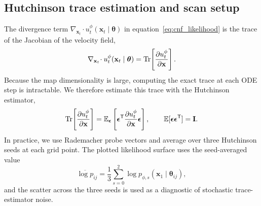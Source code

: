 \documentclass[usenatbib]{mnras}
\newcommand{\thetavec}{\boldsymbol{\theta}}
\begin{document}
\subsection{Hutchinson trace estimation and scan setup}
\label{sec:likelihood_hutchinson}
The divergence term
$\nabla_{\mathbf{x}_t}\!\cdot
u_t^\phi(\mathbf{x}_t\mid\thetavec)$ in
equation~\eqref{eq:cnf_likelihood}
is the trace of the Jacobian of the velocity field,
\begin{equation}
  \nabla_{\mathbf{x}_t}\!\cdot
  u_t^\phi(\mathbf{x}_t\mid\thetavec)
  =
  {\rm Tr}\!\left[
    \frac{\partial u_t^\phi}{\partial \mathbf{x}}
  \right].
  \label{eq:trace_exact}
\end{equation}
Because the map dimensionality is large, computing the exact trace at
each ODE step is intractable. We therefore estimate this trace with
the Hutchinson estimator,
\begin{equation}
  {\rm Tr}\!\left[
    \frac{\partial u_t^\phi}{\partial \mathbf{x}}
  \right]
  =
  \mathbb{E}_{\boldsymbol{\epsilon}}
  \left[
    \boldsymbol{\epsilon}^{\mathsf T}
    \frac{\partial u_t^\phi}{\partial \mathbf{x}}
    \boldsymbol{\epsilon}
  \right],
  \qquad
  \mathbb{E}
  [\boldsymbol{\epsilon}\boldsymbol{\epsilon}^{\mathsf T}]
  =
  \mathbf{I}.
  \label{eq:hutchinson}
\end{equation}
In practice, we use Rademacher probe vectors and average over three
Hutchinson seeds at each grid point. The plotted likelihood surface
uses the seed-averaged value
\begin{equation}
  \overline{\log p}_{ij}
  =
  \frac{1}{3}
  \sum_{s=0}^{2}
  \log p_{\phi,s}
  (\mathbf{x}_1\mid\thetavec_{ij}),
  \label{eq:hutchinson_mean}
\end{equation}
and the scatter across the three seeds is used as a diagnostic of
stochastic trace-estimator noise.
\end{document}
